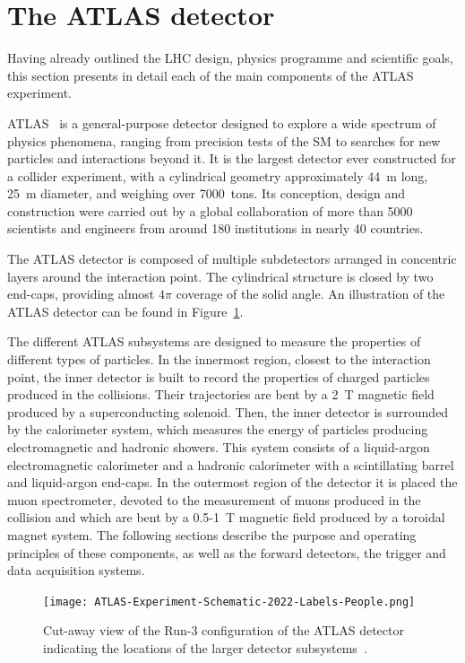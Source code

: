 \section{The ATLAS detector}
\label{sec:ATLAS}

Having already outlined the LHC design, physics programme and scientific goals, this section presents in detail each of the main components of the ATLAS experiment.

ATLAS~\cite{ATLAS:exp,ATLAS_run3} is a general-purpose detector designed to explore a wide spectrum of physics phenomena, ranging from precision tests of the SM to searches for new particles and interactions beyond it. It is the largest 
detector ever constructed for a collider experiment, with a cylindrical geometry approximately 44~m long, 25~m diameter, and weighing over 7000~tons. Its conception, design and construction were carried out by a global collaboration of more than 5000 scientists and engineers from around 180 institutions in nearly 40 countries.

The ATLAS detector is composed of multiple subdetectors arranged in concentric layers 
around the interaction point. The cylindrical structure is closed by two end-caps, providing almost $4\pi$ coverage of the solid angle. An illustration of the ATLAS detector can be found in Figure~\ref{fig:ATLASdet}.

The different ATLAS subsystems are designed to measure the properties of different types of particles. In the innermost region, closest to the interaction point, the inner detector is built to record the properties of charged particles produced in the collisions. Their trajectories 
are bent by a 2~T magnetic field produced by a superconducting solenoid. Then, the inner detector is surrounded by the calorimeter system, which measures the energy of particles producing electromagnetic and hadronic showers. This system consists of a liquid-argon electromagnetic calorimeter and a hadronic calorimeter with a scintillating barrel and liquid-argon end-caps.
In the outermost region of the detector it is placed the muon spectrometer, devoted to the measurement of muons produced in the collision and which are bent by a 0.5-1~T magnetic field produced by a toroidal magnet system.
The following sections describe the purpose and operating principles of these components, as well as the forward detectors, the trigger and data acquisition systems.

\begin{figure}[htbp]
    \centering
        \texttt{[image: ATLAS-Experiment-Schematic-2022-Labels-People.png]}
    \caption{Cut-away view of the Run-3 configuration of the ATLAS detector indicating the locations of the larger detector subsystems~\cite{Bianchi:2837191}.}
    \label{fig:ATLASdet}
\end{figure}

